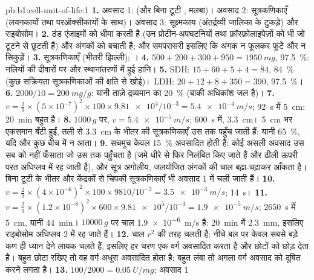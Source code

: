 \begin{solution}{pb:b1:cell-unit-of-life:1}
\textbf{1.} अवसाद 1:  (और बिना टूटी , मलबा)। अवसाद 2:
सूत्रकणिकाएँ (लयनकायों तथा परऑक्सीकायों के साथ)। अवसाद 3: सूक्ष्मकाय
(अंतर्द्रव्यी जालिका के टुकड़े) और राइबोसोम।
\textbf{2.} ठंड एंजाइमों को धीमा करती है (उन प्रोटीन-अपघटनियों तथा
फ़ॉस्फ़ोलाइपेज़ों को भी जो टूटने से छूटती हैं) और अंगकों को बचाती है;
और समपरासरी इसलिए कि अंगक न फूलकर फूटें और न सिकुड़ें।
\textbf{3.} सूत्रकणिकाएँ (भीतरी झिल्ली); ।
\textbf{4.} $500 + 200 + 300 + 950 = \qty{1950}{mg}$, \qty{97.5}{\%}:
नलियों की दीवारों पर और स्थानांतरणों में हुई हानि।
\textbf{5.} SDH: $15 + 60 + 5 + 4 = 84$, \qty{84}{\%} (कुछ सक्रियता
सूत्रकणिकाओं की क्षति से खोई)। LDH: $20 + 12 + 8 + 350 = 390$,
\qty{97.5}{\%}।
\textbf{6.} $2000/10 = \qty{200}{mg/g}$: यानी ताज़े द्रव्यमान का \qty{20}{\%} (बाकी अधिकांश जल है)।
\textbf{7.} $v = \frac{2}{9}\times(5\times 10^{-7})^2\times 100\times
\num{9.81e4}/10^{-3} = \qty{5.4e-4}{m/s}$; \qty{92}{s} में \qty{5}{cm}:
\qty{20}{min} बहुत है।
\textbf{8.} $1000\,g$ पर, $v = \qty{5.4e-5}{m/s}$; \qty{600}{s} में,
\qty{3.3}{cm}। \qty{5}{cm} भर एकसमान बँटी हुईं, तली से \qty{3.3}{cm} के
भीतर की सूत्रकणिकाएँ उस तक पहुँच जाती हैं: यानी \qty{65}{\%}, यदि और कुछ
बीच में न आता।
\textbf{9.} सचमुच केवल \qty{15}{\%} अवसादित होती हैं: कोई असली अवसाद उस
सब को नहीं फँसाता जो उस तक पहुँचता है (जमे  धीरे से फिर निलंबित
किए जाते हैं और ढीली ऊपरी परत अधिप्लव में रह जाती है), और सूत्र अगोलीय,
जलयोजित अंगकों की चाल बढ़ा-चढ़ाकर आँकता है।
बिना टूटी  के भीतर और केंद्रकों से चिपकी सूत्रकणिकाएँ भी अवसाद 1
में चली जाती हैं।
\textbf{10.} $v = \frac{2}{9}\times(4\times 10^{-6})^2\times 100\times
9810/10^{-3} = \qty{3.5e-3}{m/s}$; \qty{14}{s}।
\textbf{11.} $v = \frac{2}{9}\times(1.2\times 10^{-8})^2\times 600\times
\num{9.81e5}/10^{-3} = \qty{1.9e-5}{m/s}$; \qty{2650}{s} में \qty{5}{cm},
यानी \qty{44}{min}। $\num{10000}\,g$ पर चाल \qty{1.9e-6}{m/s} है:
\qty{20}{min} में \qty{2.3}{mm}, इसलिए राइबोसोम अधिप्लव 2 में रह जाते हैं।
\textbf{12.} चाल $r^2$ की तरह चलती है: नीचे बल पर केवल सबसे बड़े कण ही
ध्यान देने लायक चलते हैं, इसलिए हर चरण एक वर्ग अवसादित करता है और छोटों
को छोड़ देता है। बहुत छोटा रखिए तो वह वर्ग अधूरा अवसादित होता है; बहुत
लंबा तो अगला वर्ग अवसाद को दूषित करने लगता है।
\textbf{13.}  $100/2000 = \qty{0.05}{U/mg}$; अवसाद 1

\end{solution}
